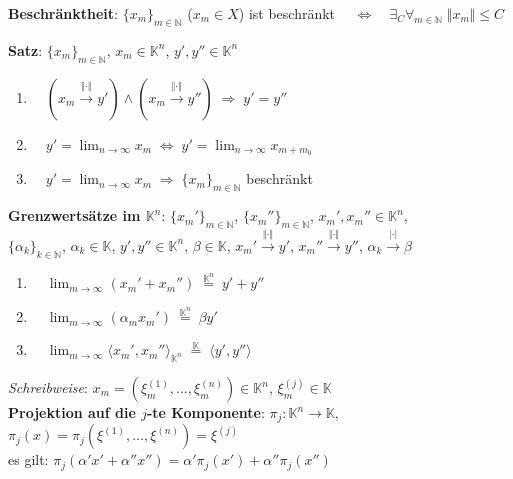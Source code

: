 \textbf{Beschränktheit}:
$\{x_m\}_{m \in \mathbb{N}}$ ($x_m \in X$) ist beschränkt
$\quad\Leftrightarrow\quad \exists_{C} \forall_{m \in \mathbb{N}}\;
\Vert x_m \Vert \le C$

\linie
\pagebreak

\textbf{Satz}: \quad
$\{x_m\}_{m \in \mathbb{N}}$, $x_m \in \mathbb{K}^n$,
$y', y'' \in \mathbb{K}^n$

\begin{enumerate}
    \item $\quad (x_m \xrightarrow{\Vert \cdot \Vert} y') \land
    (x_m \xrightarrow{\Vert \cdot \Vert} y'') \;\Rightarrow\; y' = y''$
    
    \item $\quad y' = \lim_{n \to \infty} x_m \;\Leftrightarrow\;
    y' = \lim_{n \to \infty} x_{m + m_0}$
    
    \item $\quad y' = \lim_{n \to \infty} x_m \;\Rightarrow\;
    \{x_m\}_{m \in \mathbb{N}}$ beschränkt
\end{enumerate}

\textbf{Grenzwertsätze im $\mathbb{K}^n$}: \quad
$\{x_m'\}_{m \in \mathbb{N}}$, $\{x_m''\}_{m \in \mathbb{N}}$,
$x_m', x_m'' \in \mathbb{K}^n$, \\
$\{\alpha_k\}_{k \in \mathbb{N}}$,
$\alpha_k \in \mathbb{K}$, \quad
$y', y'' \in \mathbb{K}^n$,
$\beta \in \mathbb{K}$, \quad
$x_m' \xrightarrow{\Vert \cdot \Vert} y'$,
$x_m'' \xrightarrow{\Vert \cdot \Vert} y''$,
$\alpha_k \xrightarrow{|\cdot|} \beta$

\begin{enumerate}
    \item $\quad \lim_{m \to \infty} (x_m' + x_m'')
    \;\overset{\mathbb{K}^n}{=}\; y' + y''$
    
    \item $\quad \lim_{m \to \infty} (\alpha_m x_m')
    \;\overset{\mathbb{K}^n}{=}\; \beta y'$
    
    \item $\quad \lim_{m \to \infty}
    \langle x_m', x_m'' \rangle_{\mathbb{K}^n}
    \;\overset{\mathbb{K}}{=}\; \langle y', y'' \rangle$
\end{enumerate}

\linie

\emph{Schreibweise}:
$x_m = (\xi_m^{(1)}, \ldots, \xi_m^{(n)}) \in \mathbb{K}^n$,
$\xi_m^{(j)} \in \mathbb{K}$ \\
\textbf{Projektion auf die $j$-te Komponente}:
$\pi_j: \mathbb{K}^n \rightarrow \mathbb{K}$,
$\pi_j(x) = \pi_j(\xi^{(1)}, \ldots, \xi^{(n)}) = \xi^{(j)}$ \\
es gilt:
$\pi_j(\alpha'x' + \alpha''x'') = \alpha'\pi_j(x') + \alpha''\pi_j(x'')$

